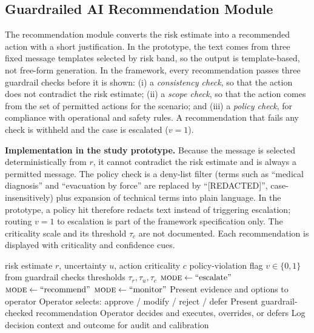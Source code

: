 \documentclass[journal]{IEEEtran}
\theoremstyle{plain}
\theoremstyle{definition}
\begin{document}
    \subsection{Guardrailed AI Recommendation Module}
    \label{sec:guardrails}
    The recommendation module converts the risk estimate into a recommended action with a short justification. In the prototype, the text comes from three fixed message templates selected by risk band, so the output is template-based, not free-form generation. In the framework, every recommendation passes three guardrail checks before it is shown: (i) a \emph{consistency check}, so that the action does not contradict the risk estimate; (ii) a \emph{scope check}, so that the action comes from the set of permitted actions for the scenario; and (iii) a \emph{policy check}, for compliance with operational and safety rules. A recommendation that fails any check is withheld and the case is escalated ($v=1$).

    \textbf{Implementation in the study prototype.} Because the message is selected deterministically from $r$, it cannot contradict the risk estimate and is always a permitted message. The policy check is a deny-list filter (terms such as ``medical diagnosis'' and ``evacuation by force'' are replaced by ``[REDACTED]'', case-insensitively) plus expansion of technical terms into plain language. In the prototype, a policy hit therefore redacts text instead of triggering escalation; routing $v=1$ to escalation is part of the framework specification only. The criticality scale and its threshold $\tau_c$ are not documented. Each recommendation is displayed with criticality and confidence cues.
    \begin{algorithm}[t]
        \caption{Uncertainty-aware escalation and human override policy}
        \label{alg:escalation}
        \begin{algorithmic}[1]
            \Require risk estimate $r$, uncertainty $u$, action criticality $c$
            \Require policy-violation flag $v \in \{0,1\}$ from guardrail checks
            \Require thresholds $\tau_r, \tau_u, \tau_c$
            \State $\textsc{mode} \leftarrow \text{``escalate''}$ 
            \State $\textsc{mode} \leftarrow \text{``recommend''}$ 
            \Else
            \State $\textsc{mode} \leftarrow \text{``monitor''}$
            \EndIf
            \State Present evidence and options to operator
            \State Operator selects: approve / modify / reject / defer
            \State Present guardrail-checked recommendation
            \State Operator decides and executes, overrides, or defers
            \EndIf
            \State Log decision context and outcome for audit and calibration
        \end{algorithmic}
    \end{algorithm}
\end{document}
